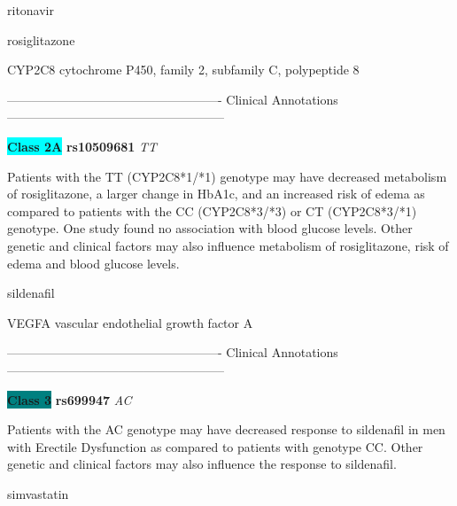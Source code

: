 \documentclass{resume} %
\begin{document}
\begin{rSection}{ ritonavir }
\end{rSection}\begin{rSection}{ rosiglitazone }
\item[]

\begin{rSubsection}{ CYP2C8 }{ cytochrome P450, family 2, subfamily C, polypeptide 8 }{}{}
\item[]

\item[] ---------------------------------------------------- Clinical Annotations -----------------------------------------------------\newline
\item \textbf{\colorbox{cyan} {Class 2A}} \textbf{ rs10509681 } \textit{ TT }
\item[] Patients with the TT (CYP2C8*1/*1) genotype may have decreased metabolism of rosiglitazone, a larger change in HbA1c, and an increased risk of edema as compared to patients with the CC (CYP2C8*3/*3) or CT (CYP2C8*3/*1) genotype. One study found no association with blood glucose levels. Other genetic and clinical factors may also influence metabolism of rosiglitazone, risk of edema and blood glucose levels.
\end{rSubsection}

\end{rSection}\begin{rSection}{ sildenafil }
\item[]

\begin{rSubsection}{ VEGFA }{ vascular endothelial growth factor A }{}{}
\item[]

\item[] ---------------------------------------------------- Clinical Annotations -----------------------------------------------------\newline
\item \textbf{\colorbox{teal} {Class 3}} \textbf{ rs699947 } \textit{ AC }
\item[] Patients with the AC genotype may have decreased response to sildenafil in men with Erectile Dysfunction as compared to patients with genotype CC. Other genetic and clinical factors may also influence the response to sildenafil.
\end{rSubsection}

\end{rSection}\begin{rSection}{ simvastatin }
\item[]


\end{rSection}
\end{document}
